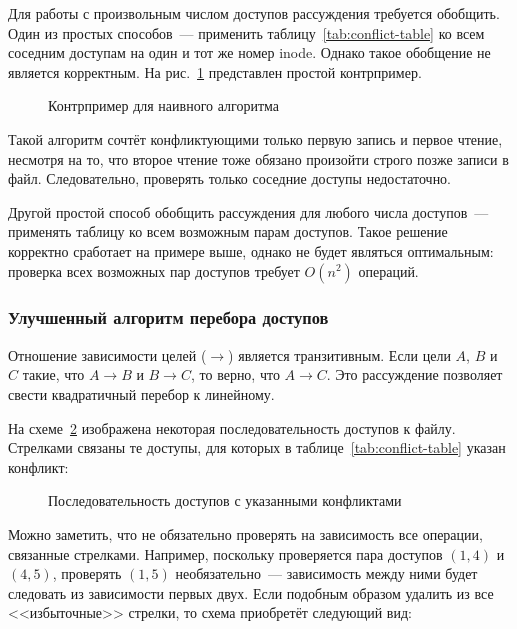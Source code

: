 Для работы с произвольным числом доступов рассуждения требуется обобщить. Один из простых способов~--- применить таблицу~\ref{tab:conflict-table} ко всем соседним доступам на один и тот же номер inode. Однако такое обобщение не является корректным. На рис.~\ref{fig:naive-conflict-break} представлен простой контрпример.

\begin{figure}[H]
    \centering
    
    \caption{Контрпример для наивного алгоритма}
    \label{fig:naive-conflict-break}
\end{figure}

Такой алгоритм сочтёт конфликтующими только первую запись и первое чтение, несмотря на то, что второе чтение тоже обязано произойти строго позже записи в файл. Следовательно, проверять только соседние доступы недостаточно.

Другой простой способ обобщить рассуждения для любого числа доступов~--- применять таблицу ко всем возможным парам доступов. Такое решение корректно сработает на примере выше, однако не будет являться оптимальным: проверка всех возможных пар доступов требует $O(n^2)$ операций.

\subsubsection{Улучшенный алгоритм перебора доступов}
\label{subsubsec:linear-time-proof}

Отношение зависимости целей ($\rightarrow$) является транзитивным. Если цели $A$, $B$ и $C$ такие, что $A \rightarrow B$ и $B \rightarrow C$, то верно, что $A \rightarrow C$. Это рассуждение позволяет свести квадратичный перебор к линейному.

На схеме~\ref{fig:all-conflicts} изображена некоторая последовательность доступов к файлу. Стрелками связаны те доступы, для которых в таблице~\ref{tab:conflict-table} указан конфликт:

\begin{figure}[H]
    \centering
    
    \caption{Последовательность доступов с указанными конфликтами}
    \label{fig:all-conflicts}
\end{figure}

Можно заметить, что не обязательно проверять на зависимость все операции, связанные стрелками. Например, поскольку проверяется пара доступов $(1, 4)$ и $(4, 5)$, проверять $(1, 5)$ необязательно~--- зависимость между ними будет следовать из зависимости первых двух. Если подобным образом удалить из все <<избыточные>> стрелки, то схема приобретёт следующий вид:


